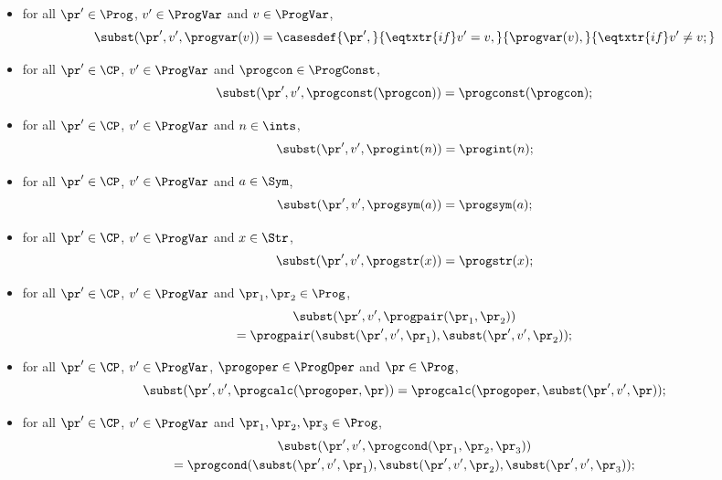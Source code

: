 \begin{itemize}
\item for all $\pr'\in\Prog$, $v'\in\ProgVar$ and $v\in\ProgVar$,
\begin{displaymath}
\subst(\pr',v',\progvar(v)) =
\casesdef{\pr',}{\eqtxtr{if} v'=v ,}%
{\progvar(v),}{\eqtxtr{if} v'\neq v ;}
\end{displaymath}

\item for all $\pr'\in\CP$, $v'\in\ProgVar$ and $\progcon\in\ProgConst$,
  \begin{displaymath}
    \subst(\pr',v',\progconst(\progcon)) = \progconst(\progcon) ;
  \end{displaymath}

\item for all $\pr'\in\CP$, $v'\in\ProgVar$ and $n\in\ints$,
  \begin{displaymath}
    \subst(\pr',v',\progint(n)) = \progint(n) ;
  \end{displaymath}

\item for all $\pr'\in\CP$, $v'\in\ProgVar$ and $a\in\Sym$,
  \begin{displaymath}
    \subst(\pr',v',\progsym(a)) = \progsym(a) ;
  \end{displaymath}

\item for all $\pr'\in\CP$, $v'\in\ProgVar$ and $x\in\Str$,
  \begin{displaymath}
    \subst(\pr',v',\progstr(x)) = \progstr(x) ;
  \end{displaymath}

\item for all $\pr'\in\CP$, $v'\in\ProgVar$ and $\pr_1,\pr_2\in\Prog$,
  \begin{multline*}
    \subst(\pr',v',\progpair(\pr_1,\pr_2)) \\
    = \progpair(\subst(\pr',v',\pr_1),\subst(\pr',v',\pr_2)) ;
  \end{multline*}

\item for all $\pr'\in\CP$, $v'\in\ProgVar$, $\progoper\in\ProgOper$ and
  $\pr\in\Prog$,
  \begin{displaymath}
    \subst(\pr',v',\progcalc(\progoper, \pr)) =
    \progcalc(\progoper,\subst(\pr',v',\pr)) ;
  \end{displaymath}

\item for all $\pr'\in\CP$, $v'\in\ProgVar$ and $\pr_1,\pr_2,\pr_3\in\Prog$,
  \begin{multline*}
    \subst(\pr',v',\progcond(\pr_1,\pr_2,\pr_3)) \\
    = \progcond(\subst(\pr',v',\pr_1),\subst(\pr',v',\pr_2),
      \subst(\pr',v',\pr_3)) ;
  \end{multline*}


\end{itemize}
